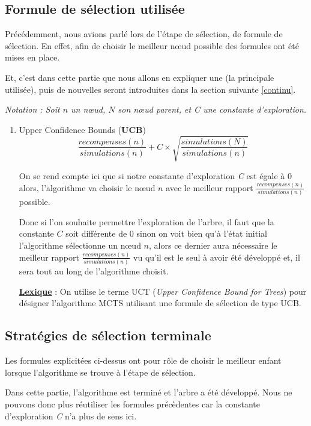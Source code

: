 \documentclass[pdftex,french, english]{article}	%
\begin{document}
    
	\subsection{Formule de sélection utilisée} \label{selection}
	Précédemment, nous avions parlé lors de l'étape de sélection, de formule de sélection. 
	En effet, afin de choisir le meilleur nœud possible des formules ont été mises en place.


	Et, c'est dans cette partie que nous allons en expliquer une (la principale utilisée), puis de nouvelles seront introduites
	dans la section suivante \ref{continu}.

	\textit{Notation : Soit $n$ un nœud, $N$ son nœud parent, et C une constante d'exploration.} 

	\begin{enumerate}
		\item Upper Confidence Bounds (\textbf{UCB}) \\
		\[ \frac{recompenses(n)}{simulations(n)} + C \times \sqrt{\frac{simulations(N)}{simulations(n)}} \] 

		On se rend compte ici que si notre constante d'exploration \textit{C} est égale à $0$ alors, l'algorithme va choisir le nœud $n$ avec le meilleur rapport $\frac{recompenses(n)}{simulations(n)}$ possible. 

		Donc si l'on souhaite permettre l'exploration de l'arbre, il faut que la constante $C$ soit différente de $0$ sinon on voit bien qu'à l'état initial l'algorithme sélectionne un nœud $n$, alors ce dernier aura nécessaire le meilleur rapport $\frac{recompenses(n)}{simulations(n)}$ vu qu'il est le seul à avoir été développé et,  il sera tout au long de l'algorithme choisit. 


		\underline{\textbf{Lexique}} : On utilise le terme UCT (\textit{Upper Confidence Bound for Trees}) pour désigner l'algorithme MCTS utilisant une formule de sélection de type UCB.
	\end{enumerate}





	\subsection{Stratégies de sélection terminale}
	Les formules explicitées ci-dessus ont pour rôle de choisir le meilleur enfant lorsque l'algorithme se trouve à l'étape de sélection. 

	Dans cette partie, l'algorithme est terminé et l'arbre a été développé. Nous ne pouvons donc plus réutiliser les formules précèdentes car la constante d'exploration \textit{C} n'a plus de sens ici. 
\end{document}

